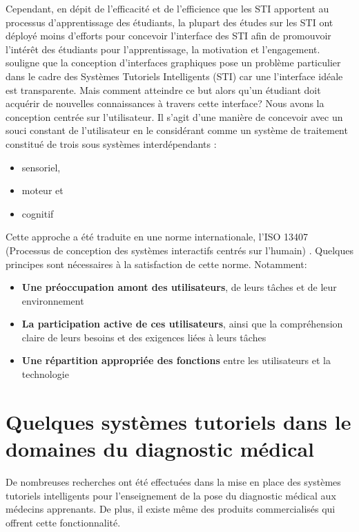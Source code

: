 Cependant, en dépit de l'efficacité et de l'efficience que les STI apportent au processus d'apprentissage des étudiants, la plupart des études sur les STI ont déployé moins d'efforts pour concevoir l'interface des STI afin de promouvoir l'intérêt des étudiants pour l'apprentissage, la motivation et l'engagement. \cite{guide_ui_conception} souligne que la conception d'interfaces graphiques pose un problème particulier dans le cadre des Systèmes Tutoriels Intelligents (STI) car une l'interface idéale est transparente. Mais comment atteindre ce but alors qu'un étudiant doit acquérir de nouvelles connaissances à travers cette interface? Nous avons la conception centrée sur l'utilisateur. Il s'agit d'une manière de concevoir avec un souci constant de l'utilisateur en le considérant comme un système de traitement constitué de trois sous systèmes interdépendants \cite{ccu}:
    \begin{itemize}
        \item sensoriel,
        \item moteur et
        \item cognitif
    \end{itemize}
    
    Cette approche a été traduite en une norme internationale, l’ISO 13407 (Processus de conception des systèmes interactifs centrés sur l’humain) \cite{iso13407}. Quelques principes sont nécessaires à la satisfaction de cette norme. Notamment:
    \begin{itemize}
        \item  \textbf{Une préoccupation amont des utilisateurs}, de leurs tâches et de leur environnement
        \item \textbf{ La participation active de ces utilisateurs}, ainsi que la compréhension claire de leurs besoins et des exigences liées à
leurs tâches
        \item \textbf{Une répartition appropriée des fonctions} entre les utilisateurs et la technologie
    \end{itemize}

\newpage

\section{Quelques systèmes tutoriels dans le domaines du diagnostic médical}
De nombreuses recherches ont été effectuées dans la mise en place des systèmes tutoriels intelligents pour l'enseignement de la pose du diagnostic médical aux médecins apprenants. De plus, il existe même des produits commercialisés qui offrent cette fonctionnalité.


